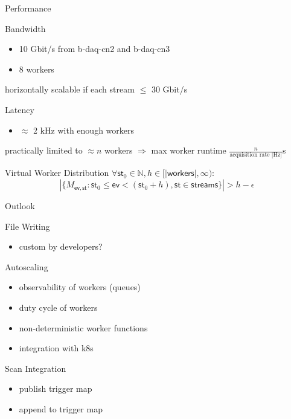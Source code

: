 \documentclass[aspectratio=169]{beamer}
\begin{document}
\begin{frame}{Performance}
 \begin{block}{Bandwidth}
  \begin{itemize}
   \item 10 Gbit/s from b-daq-cn2 and b-daq-cn3
   \item 8 workers
  \end{itemize}
 horizontally scalable if each stream $\leq$ 30 Gbit/s
 \end{block}
 
 \begin{block}{Latency}
  \begin{itemize}
   \item $\approx$ 2 kHz with enough workers
  \end{itemize}
  practically limited to $\approx n$  workers $\Rightarrow$ max worker runtime $\frac{n}{\text{acquisition rate [Hz]}}$s
 \end{block}
    \newcommand{\ev}{\mathsf{ev}}
    \newcommand{\st}{\mathsf{st}}
  \begin{block}{Virtual Worker Distribution}
  $\forall \st_0\in\mathbb{N}, h\in[|\mathsf{workers}|,\infty):$
   \[|\{M_{\ev,\st} : \st_0\leq\ev<(\st_0+h), \st\in\mathsf{streams}\}| > h-\epsilon \]
  \end{block}


\end{frame}




\begin{frame}{Outlook}
 \begin{block}{File Writing}
  \begin{itemize}
   \item custom by developers?
  \end{itemize}

 \end{block}
 
 \begin{block}{Autoscaling}
  \begin{itemize}
   \item observability of workers (queues)
   \item duty cycle of workers
   \item non-deterministic worker functions
   \item integration with k8s
  \end{itemize}

 \end{block}


 \begin{block}{Scan Integration}
  \begin{itemize}
   \item publish trigger map
   \item append to trigger map
  \end{itemize}

 \end{block}

\end{frame}
\end{document}

